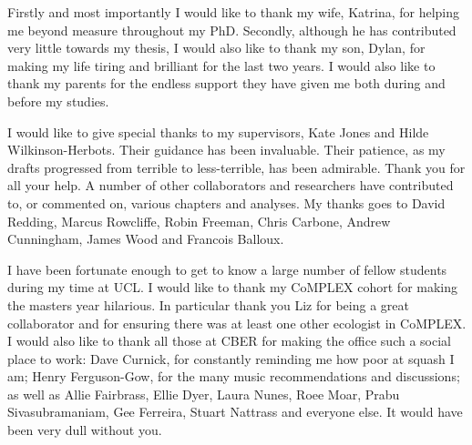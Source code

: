 \begin{acknowledgements}



Firstly and most importantly I would like to thank my wife, Katrina, for helping me beyond measure throughout my PhD.
Secondly, although he has contributed very little towards my thesis, I would also like to thank my son, Dylan, for making my life tiring and brilliant for the last two years.
I would also like to thank my parents for the endless support they have given me both during and before my studies.



I would like to give special thanks to my supervisors, Kate Jones and Hilde Wilkinson-Herbots.
Their guidance has been invaluable.
Their patience, as my drafts progressed from terrible to less-terrible, has been admirable.
Thank you for all your help.
A number of other collaborators and researchers have contributed to, or commented on, various chapters and analyses.
My thanks goes to David Redding, Marcus Rowcliffe, Robin Freeman, Chris Carbone, Andrew Cunningham, James Wood and Francois Balloux.


I have been fortunate enough to get to know a large number of fellow students during my time at UCL.
I would like to thank my CoMPLEX cohort for making the masters year hilarious.
In particular thank you Liz for being a great collaborator and for ensuring there was at least one other ecologist in CoMPLEX.
I would also like to thank all those at CBER for making the office such a social place to work: Dave Curnick, for constantly reminding me how poor at squash I am; Henry Ferguson-Gow, for the many music recommendations and discussions; as well as Allie Fairbrass, Ellie Dyer, Laura Nunes, Roee Moar, Prabu Sivasubramaniam, Gee Ferreira, Stuart Nattrass and everyone else.
It would have been very dull without you.


\end{acknowledgements}

\setcounter{tocdepth}{2} 

\tableofcontents
\listoffigures
\listoftables

